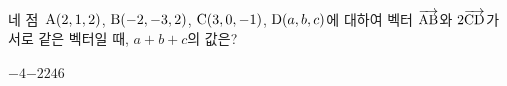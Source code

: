네 점~$\mathrm{A}(2{,}\mkern3mu\mathopen{}1{,}\mkern3mu\mathopen{}2)$, $\mathrm{B}(-2{,}\mkern3mu\mathopen{}-3{,}\mkern3mu\mathopen{}2)$, $\mathrm{C}(3{,}\mkern3mu\mathopen{}0{,}\mkern3mu\mathopen{}-1)$, $\mathrm{D}(a{,}\mkern3mu\mathopen{}b{,}\mkern3mu\mathopen{}c)$에 대하여 벡터 $\overrightarrow{\mathrm{AB}}$와 $2\overrightarrow{\mathrm{CD}}$가 서로 같은 벡터일 때, $a+b+c$의 값은?
\begin{choices32}{$-4$}{$-2$}{$2$}{$4$}{$6$}\end{choices32}

